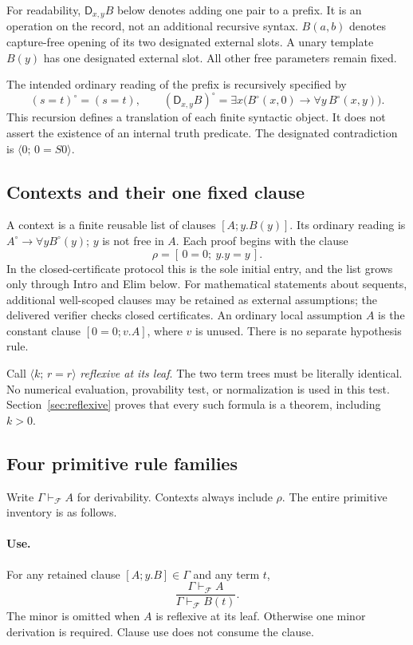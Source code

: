 \documentclass[11pt]{article}
\theoremstyle{definition}\newtheorem{definition}[theorem]{Definition}
\theoremstyle{remark}\newtheorem{remark}[theorem]{Remark}
\newcommand{\D}{\mathsf D}
\newcommand{\F}{\mathcal F}
\newcommand{\Eq}[3]{\langle #1;\,#2=#3\rangle}
\begin{document}
For readability, $\D_{x,y}B$ below denotes adding one pair to a prefix.
It is an operation on the record, not an additional recursive syntax.
$B(a,b)$ denotes capture-free opening of its two designated external slots.
A unary template $B(y)$ has one designated external slot. All other free
parameters remain fixed.

The intended ordinary reading of the prefix is recursively specified by
\[
 (s=t)^\circ=(s=t),\qquad
 (\D_{x,y}B)^\circ
  =\exists x\bigl(B^\circ(x,0)\to\forall y\,B^\circ(x,y)\bigr).
 \tag{2}\label{eq:ordinary-D}
\]
This recursion defines a translation of each finite syntactic object.
It does not assert the existence of an internal truth predicate.
The designated contradiction is $\Eq{0}{0}{S0}$.

\subsection{Contexts and their one fixed clause}

A context is a finite reusable list of clauses $[A;y.B(y)]$. Its ordinary
reading is $A^\circ\to\forall y B^\circ(y)$; $y$ is not free in $A$.
Each proof begins with the clause
\[
 \rho=[\,0=0;\ y.y=y\,].
 \tag{3}\label{eq:rho}
\]
In the closed-certificate protocol this is the sole initial entry, and
the list grows only through Intro and Elim below. For mathematical
statements about sequents, additional well-scoped clauses may be retained
as external assumptions; the delivered verifier checks closed certificates.
An ordinary local
assumption $A$ is the constant clause $[0=0;v.A]$, where $v$ is unused.
There is no separate hypothesis rule.

Call $\Eq{k}{r}{r}$ \emph{reflexive at its leaf}. The two term trees must
be literally identical. No numerical evaluation, provability test, or
normalization is used in this test. Section~\ref{sec:reflexive}
proves that every such formula is a theorem, including $k>0$.

\subsection{Four primitive rule families}

Write $\Gamma\vdash_\F A$ for derivability. Contexts always include $\rho$.
The entire primitive inventory is as follows.

\paragraph{Use.}
For any retained clause $[A;y.B]\in\Gamma$ and any term $t$,
\[
 \frac{\Gamma\vdash_\F A}{\Gamma\vdash_\F B(t)}.
 \tag{Use}
\]
The minor is omitted when $A$ is reflexive at its leaf. Otherwise one
minor derivation is required. Clause use does not consume the clause.
\end{document}
